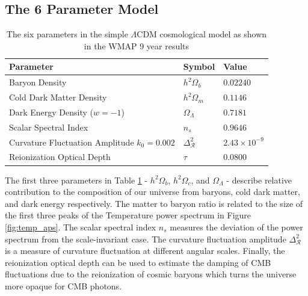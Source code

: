 \documentclass[12pt]{article}
\begin{document}
\subsection{The 6 Parameter Model}

\begin{table}
	\center
\begin{tabular}{|l|l|l|}
	\hline
	Parameter & Symbol & Value \\ \hline \hline
	Baryon Density & $h^2\Omega _b$ &  $0.02240$\\ \hline
	Cold Dark Matter Density & $h^2\Omega _m$ & $0.1146$ \\ \hline
	Dark Energy Density ($w=-1$) & $\Omega _\Lambda$ & $0.7181$ \\ \hline
	Scalar Spectral Index & $n_s$ & $0.9646$ \\ \hline
	Curvature Fluctuation Amplitude $k_0=0.002$ & $\Delta _\mathcal{R} ^2$ & $2.43
	\times 10^{-9}$\\ \hline
	Reionization Optical Depth & $\tau$ & $0.0800$\\ \hline
\end{tabular}
	\caption{The six parameters in the simple $\Lambda$CDM
	cosmological model as shown in the WMAP 9 year results\cite{cite:WMAP9}}
	\label{table:lcdm6par}
\end{table}

The first three parameters in Table \ref{table:lcdm6par} - $h^2\Omega_b$, $h^2\Omega _c$, and $\Omega
_\Lambda$ - describe relative contribution to the composition of our universe
from baryons, cold dark matter, and dark energy respectively. The matter to
baryon ratio is related to the size of the first three peaks of the
Temperature power spectrum in Figure \ref{fig:temp_aps}. The scalar spectral
index $n_s$ measures the deviation of the power spectrum from the
scale-invariant case.  The curvature fluctuation amplitude $\Delta
_\mathcal{R} ^2$ is a
measure of curvature fluctuation at different angular scales. Finally, the
reionization optical depth can be used to estimate the damping of CMB
fluctuations due to the reionization of cosmic baryons which turns the
universe more opaque for CMB photons.
\end{document}
